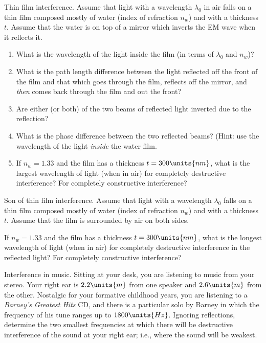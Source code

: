 \begin{aproblem}{Thin film interference.} 
  Assume that light with a wavelength $\lambda_0$ in air falls on a
  thin film composed mostly of water (index of refraction $n_w$) and
  with a thickness $t$.  Assume that the water is on top of a mirror
  which inverts the EM wave when it reflects it.
  \begin{enumerate}
  \item What is the wavelength of the light inside the film (in terms
    of $\lambda_0$ and $n_w$)?
  \item What is the path length difference between the light reflected
    off the front of the film and that which goes through the film,
    reflects off the mirror, and {\it then} comes back through the
    film and out the front?
  \item Are either (or both) of the two beams of reflected light
    inverted due to the reflection?
  \item What is the phase difference between the two reflected beams?
    (Hint: use the wavelength of the light {\it inside} the water
    film.
  \item If $n_w = 1.33$ and the film has a thickness $t =
    300\units{nm}$, what is the largest wavelength of light (when in
    air) for completely destructive interference?  For completely
    constructive interference?
  \end{enumerate}
\end{aproblem}


\begin{aproblem}{Son of thin film interference.} 
  Assume that light with a wavelength $\lambda_0$ falls on a thin film
  composed mostly of water (index of refraction $n_w$) and with a
  thickness $t$. Assume that the film is surrounded by air on both
  sides.

  If $n_w = 1.33$ and the film has a thickness $t = 300\units{nm}$,
  what is the longest wavelength of light (when in air) for completely
  destructive interference in the reflected light?  For completely
  constructive interference?
\end{aproblem}


\begin{aproblem}{Interference in music.}  
  Sitting at your desk, you are listening to music from your stereo.
  Your right ear is $2.2\units{m}$ from one speaker and $2.6\units{m}$
  from the other.  Nostalgic for your formative childhood years, you
  are listening to a {\it Barney's Greatest Hits} CD, and there is a
  particular solo by Barney in which the frequency of his tune ranges
  up to $1800\units{Hz}$.  Ignoring reflections, determine the two
  smallest frequencies at which there will be destructive interference
  of the sound at your right ear; i.e., where the sound will be
  weakest.
\end{aproblem}


